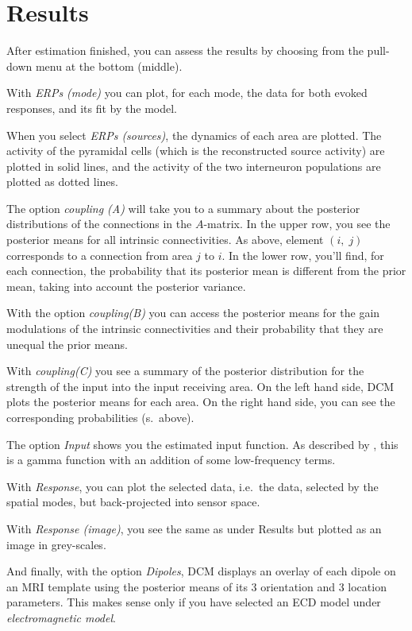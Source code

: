 \section{Results} After estimation finished, you can assess the results
by choosing from the pull-down menu at the bottom (middle). 

With \textit{ERPs (mode)} you can plot, for each mode, the data for
both evoked responses, and its fit by the model. 

When you select \textit{ERPs (sources)}, the dynamics of each area are
plotted. The activity of the pyramidal cells (which is the
reconstructed source activity) are plotted in solid
lines, and the activity of the two interneuron populations are plotted
as dotted lines.

The option \textit{coupling (A)} will take you to a summary about the
posterior distributions of the connections in the $A$-matrix. In the
upper row, you see the posterior means for all intrinsic
connectivities. As above, element $(i,\; j)$ corresponds to a
connection from area $j$ to $i$. In the lower row, you'll find, for
each connection, the probability that its posterior mean is different
from the prior mean, taking into account the posterior variance.

With the option \textit{coupling(B)} you can access the posterior
means for the gain modulations of the intrinsic connectivities and
their probability that they are unequal the prior means.

With \textit{coupling(C)} you see a summary of the posterior
distribution for the strength of the input into the input receiving
area. On the left hand side, DCM plots the posterior means for each
area. On the right hand side, you can see the corresponding
probabilities (s.~above).


The option \textit{Input} shows you the estimated input function. As
described by \cite{od_dcm_erp}, this is a gamma function with an
addition of some low-frequency terms.

With \textit{Response}, you can plot the selected data, i.e.~the data,
selected by the spatial modes, but back-projected into sensor space.

With \textit{Response (image)}, you see the same as under Results but
plotted as an image in grey-scales.

And finally, with the option \textit{Dipoles}, DCM displays an
overlay of each dipole on an MRI template using the posterior means of
its 3 orientation and 3 location parameters. This makes sense only if
you have selected an ECD model under \textit{electromagnetic model}.

